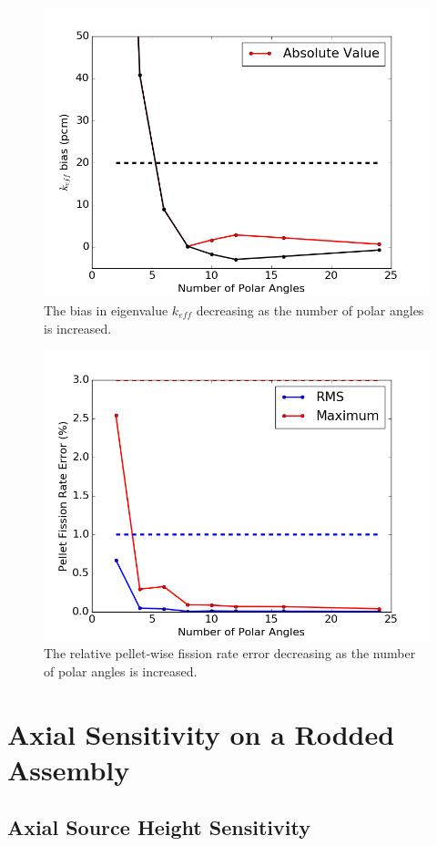 \begin{figure}[h!]
	\centering
	\includegraphics[width=0.7\linewidth]{figures/results/sensitivity/polar_angles_pcm.png}
	\caption[]{The bias in eigenvalue $k_{\textit{eff}}$ decreasing as the number of polar angles is increased.}
	\label{fig:polar-angles-pcm}
\end{figure}
\begin{figure}[h!]
	\centering
	\includegraphics[width=0.7\linewidth]{figures/results/sensitivity/polar_angles_fr.png}
	\caption[]{The relative pellet-wise fission rate error decreasing as the number of polar angles is increased.}
	\label{fig:polar-angles-fr}
\end{figure}


\section{Axial Sensitivity on a Rodded Assembly}
\label{sec:axial-sensitivity-rodded}

\subsection{Axial Source Height Sensitivity}

